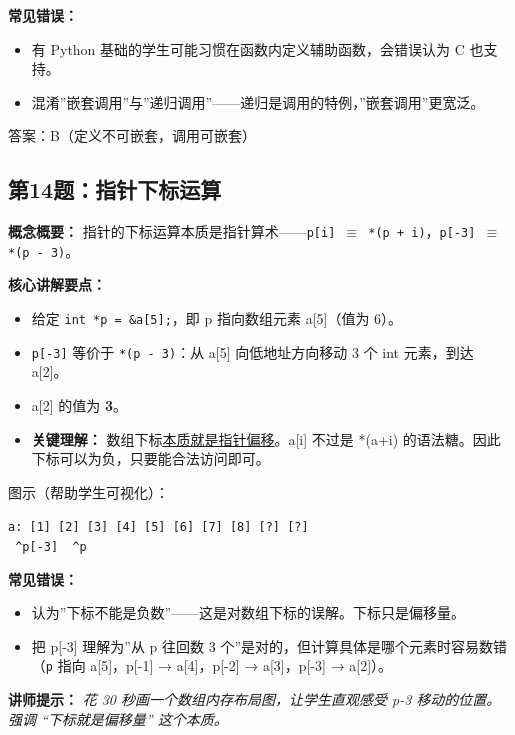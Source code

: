 \textbf{常见错误：}
\begin{itemize}
    \item 有 Python 基础的学生可能习惯在函数内定义辅助函数，会错误认为 C 也支持。
    \item 混淆”嵌套调用”与”递归调用”——递归是调用的特例，”嵌套调用”更宽泛。
\end{itemize}

{\color{highlight}答案：B（定义不可嵌套，调用可嵌套）}

\subsection{第14题：指针下标运算}

\textbf{概念概要：} 指针的下标运算本质是指针算术——\texttt{p[i] $\equiv$ *(p + i)}，\texttt{p[-3] $\equiv$ *(p - 3)}。

\textbf{核心讲解要点：}
\begin{itemize}
    \item 给定 \texttt{int *p = \&a[5];}，即 p 指向数组元素 a[5]（值为 6）。
    \item \texttt{p[-3]} 等价于 \texttt{*(p - 3)}：从 a[5] 向低地址方向移动 3 个 int 元素，到达 a[2]。
    \item a[2] 的值为 \textbf{3}。
    \item \textbf{关键理解：} 数组下标\underline{本质就是指针偏移}。a[i] 不过是 *(a+i) 的语法糖。因此下标可以为负，只要能合法访问即可。
\end{itemize}

\noindent 图示（帮助学生可视化）：

\begin{center}
\texttt{a: [1] [2] [3] [4] [5] [6] [7] [8] [?] [?]}\\
\texttt{\qquad\qquad\ \^{}p[-3] \qquad\qquad\ \^{}p}
\end{center}

\textbf{常见错误：}
\begin{itemize}
    \item 认为”下标不能是负数”——这是对数组下标的误解。下标只是偏移量。
    \item 把 p[-3] 理解为”从 p 往回数 3 个”是对的，但计算具体是哪个元素时容易数错（\texttt{p} 指向 a[5]，p[-1] → a[4]，p[-2] → a[3]，p[-3] → a[2]）。
\end{itemize}

\textbf{讲师提示：} \textit{花 30 秒画一个数组内存布局图，让学生直观感受 p-3 移动的位置。强调 “下标就是偏移量” 这个本质。}

